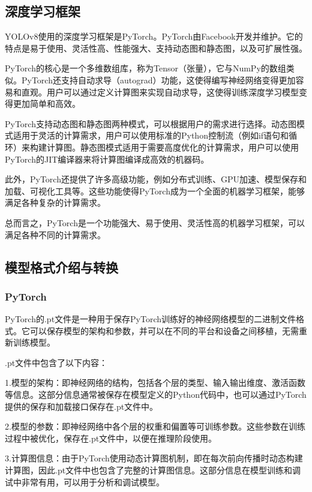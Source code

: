 \documentclass{ctexart}
\numberwithin{equation}{section}%
\numberwithin{figure}{section}%
\numberwithin{table}{section}%
\begin{document}
	\subsection{深度学习框架}
	YOLOv8使用的深度学习框架是PyTorch。PyTorch由Facebook开发并维护。它的特点是易于使用、灵活性高、性能强大、支持动态图和静态图，以及可扩展性强。
	
	PyTorch的核心是一个多维数组库，称为Tensor（张量），它与NumPy的数组类似。PyTorch还支持自动求导（autograd）功能，这使得编写神经网络变得更加容易和直观。用户可以通过定义计算图来实现自动求导，这使得训练深度学习模型变得更加简单和高效。
	
	PyTorch支持动态图和静态图两种模式，可以根据用户的需求进行选择。动态图模式适用于灵活的计算需求，用户可以使用标准的Python控制流（例如if语句和循环）来构建计算图。静态图模式适用于需要高度优化的计算需求，用户可以使用PyTorch的JIT编译器来将计算图编译成高效的机器码。
	
	此外，PyTorch还提供了许多高级功能，例如分布式训练、GPU加速、模型保存和加载、可视化工具等。这些功能使得PyTorch成为一个全面的机器学习框架，能够满足各种复杂的计算需求。
	
	总而言之，PyTorch是一个功能强大、易于使用、灵活性高的机器学习框架，可以满足各种不同的计算需求。

	\subsection{模型格式介绍与转换}
	\subsubsection{PyTorch}
	PyTorch的.pt文件是一种用于保存PyTorch训练好的神经网络模型的二进制文件格式。它可以保存模型的架构和参数，并可以在不同的平台和设备之间移植，无需重新训练模型。
	
	.pt文件中包含了以下内容：
	
	1.模型的架构：即神经网络的结构，包括各个层的类型、输入输出维度、激活函数等信息。这部分信息通常被保存在模型定义的Python代码中，也可以通过PyTorch提供的保存和加载接口保存在.pt文件中。
	
	2.模型的参数：即神经网络中各个层的权重和偏置等可训练参数。这些参数在训练过程中被优化，保存在.pt文件中，以便在推理阶段使用。
	
	3.计算图信息：由于PyTorch使用动态计算图机制，即在每次前向传播时动态构建计算图，因此.pt文件中也包含了完整的计算图信息。这部分信息在模型训练和调试中非常有用，可以用于分析和调试模型。
	
%	
%	
%	
%	
	
\end{document}
